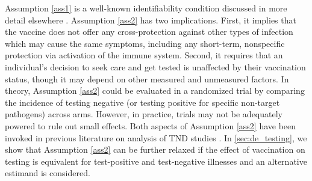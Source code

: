 \documentclass[11pt]{article}
\begin{document}
Assumption \ref{ass1} is a well-known identifiability condition discussed in more detail elsewhere \cite{hernan_causal_2020}. Assumption \ref{ass2} has two implications. First, it implies that the vaccine does not offer any cross-protection against other types of infection which may cause the same symptoms, including any short-term, nonspecific protection via activation of the immune system. Second, it requires that an individual's decision to seek care and get tested is unaffected by their vaccination status, though it may depend on other measured and unmeasured factors. In theory, Assumption \ref{ass2} could be evaluated in a randomized trial by comparing the incidence of testing negative (or testing positive for specific non-target pathogens) across arms. However, in practice, trials may not be adequately powered to rule out small effects. Both aspects of Assumption \ref{ass2} have been invoked in previous literature on analysis of TND studies \cite{jackson_test-negative_2013,feng_assessment_2017,schnitzer_estimands_2022}. In \ref{sec:de_testing}, we show that Assumption \ref{ass2} can be further relaxed if the effect of vaccination on testing is equivalent for test-positive and test-negative illnesses and an alternative estimand is considered.
\end{document}
